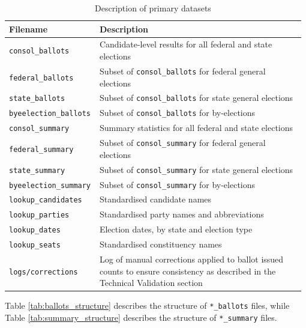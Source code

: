 \documentclass[11pt]{article}
\begin{document}
\begin{table}[H]
	\def\arraystretch{1.3}
	\centering
	\caption{Description of primary datasets}
	\label{tab:data_records}
	\vspace{0.14in}
	\begin{tabular}{L{0.29\linewidth}L{0.69\linewidth}}
	\toprule
	\textbf{Filename} & \textbf{Description} \\
	\midrule
	\texttt{consol\_ballots} & Candidate-level results for all federal and state elections \\
	\texttt{federal\_ballots} & Subset of \texttt{consol\_ballots} for federal general elections \\
	\texttt{state\_ballots} & Subset of \texttt{consol\_ballots} for state general elections \\
	\texttt{byeelection\_ballots} & Subset of \texttt{consol\_ballots} for by-elections \\ \hline
	\texttt{consol\_summary} & Summary statistics for all federal and state elections \\
	\texttt{federal\_summary} & Subset of \texttt{consol\_summary} for federal general elections \\
	\texttt{state\_summary} & Subset of \texttt{consol\_summary} for state general elections \\
	\texttt{byeelection\_summary} & Subset of \texttt{consol\_summary} for by-elections \\
	\texttt{lookup\_candidates} & Standardised candidate names \\
	\texttt{lookup\_parties} & Standardised party names and abbreviations \\
	\texttt{lookup\_dates} & Election dates, by state and election type \\
	\texttt{lookup\_seats} & Standardised constituency names \\
	\hline
	\texttt{logs/corrections} & Log of manual corrections applied to ballot issued counts to ensure consistency as described in the Technical Validation section \\
	\bottomrule
	\end{tabular}
\end{table}

Table \ref{tab:ballots_structure} describes the structure of \texttt{*\_ballots} files, while Table \ref{tab:summary_structure} describes the structure of \texttt{*\_summary} files.
\end{document}
